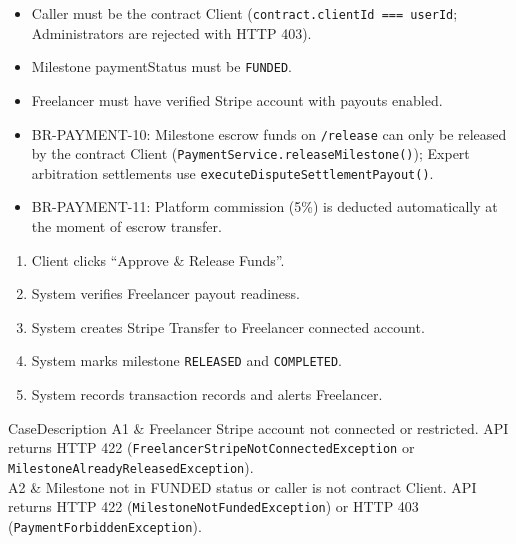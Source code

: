 \begin{itemize}[leftmargin=1.6em,topsep=3pt,itemsep=2pt,parsep=0pt,label=$\bullet$]
      \item Caller must be the contract Client (\texttt{contract.clientId === userId}; Administrators are rejected with HTTP 403).
      \item Milestone paymentStatus must be \texttt{FUNDED}.
      \item Freelancer must have verified Stripe account with payouts enabled.
\end{itemize}

\begin{itemize}[leftmargin=1.6em,topsep=3pt,itemsep=2pt,parsep=0pt,label=$\bullet$]\brrulelist
      \item BR-PAYMENT-10: Milestone escrow funds on \texttt{/release} can only be released by the contract Client (\texttt{PaymentService.releaseMilestone()}); Expert arbitration settlements use \texttt{executeDisputeSettlementPayout()}.
      \item BR-PAYMENT-11: Platform commission (5\%) is deducted automatically at the moment of escrow transfer.
\end{itemize}

\begin{enumerate}[leftmargin=1.8em,topsep=3pt,itemsep=2pt,parsep=0pt]
      \item Client clicks ``Approve \& Release Funds''.
      \item System verifies Freelancer payout readiness.
      \item System creates Stripe Transfer to Freelancer connected account.
      \item System marks milestone \texttt{RELEASED} and \texttt{COMPLETED}.
      \item System records transaction records and alerts Freelancer.
\end{enumerate}

\begin{flowtable}{Case}{Description}
      A1 & Freelancer Stripe account not connected or restricted. API returns HTTP 422 (\texttt{FreelancerStripeNotConnectedException} or \texttt{MilestoneAlreadyReleasedException}).\\ \hline
      A2 & Milestone not in FUNDED status or caller is not contract Client. API returns HTTP 422 (\texttt{MilestoneNotFundedException}) or HTTP 403 (\texttt{PaymentForbiddenException}).\\ \hline
\end{flowtable}

